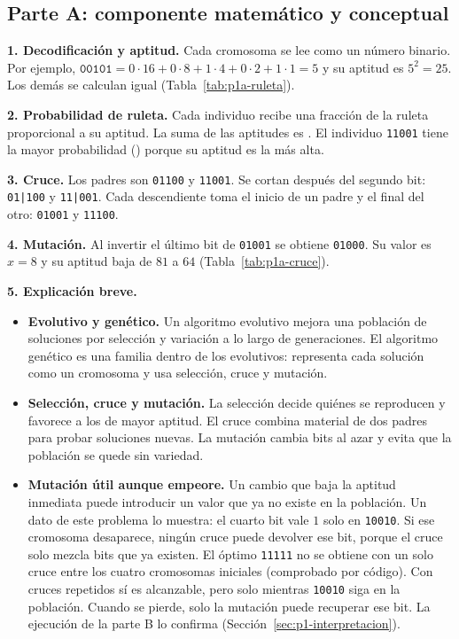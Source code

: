 \documentclass[12pt,a4paper]{article}
\begin{document}
\subsection{Parte A: componente matemático y conceptual}

\noindent\textbf{1. Decodificación y aptitud.} Cada cromosoma se lee como un
número binario. Por ejemplo,
$\texttt{00101}=0\cdot16+0\cdot8+1\cdot4+0\cdot2+1\cdot1=5$ y su aptitud es
$5^2=25$. Los demás se calculan igual (Tabla~\ref{tab:p1a-ruleta}).

\noindent\textbf{2. Probabilidad de ruleta.} Cada individuo recibe una
fracción de la ruleta proporcional a su aptitud. La suma de las aptitudes es
\PunoSuma{}. El individuo \texttt{11001} tiene la mayor probabilidad
(\PunoProbMax{}) porque su aptitud es la más alta.



\noindent\textbf{3. Cruce.} Los padres son \texttt{01100} y \texttt{11001}.
Se cortan después del segundo bit: \texttt{01|100} y \texttt{11|001}. Cada
descendiente toma el inicio de un padre y el final del otro:
\texttt{01001} y \texttt{11100}.

\noindent\textbf{4. Mutación.} Al invertir el último bit de \texttt{01001}
se obtiene \texttt{01000}. Su valor es $x=8$ y su aptitud baja de $81$ a
$64$ (Tabla~\ref{tab:p1a-cruce}).



\noindent\textbf{5. Explicación breve.}
\begin{itemize}
  \item \textbf{Evolutivo y genético.} Un algoritmo evolutivo mejora una
  población de soluciones por selección y variación a lo largo de
  generaciones. El algoritmo genético es una familia dentro de los
  evolutivos: representa cada solución como un cromosoma y usa selección,
  cruce y mutación.
  \item \textbf{Selección, cruce y mutación.} La selección decide quiénes se
  reproducen y favorece a los de mayor aptitud. El cruce combina material de
  dos padres para probar soluciones nuevas. La mutación cambia bits al azar
  y evita que la población se quede sin variedad.
  \item \textbf{Mutación útil aunque empeore.} Un cambio que baja la
  aptitud inmediata puede introducir un valor que ya no existe en la
  población. Un dato de este problema lo muestra: el cuarto bit vale $1$
  solo en \texttt{10010}. Si ese cromosoma desaparece, ningún cruce puede
  devolver ese bit, porque el cruce solo mezcla bits que ya existen. El
  óptimo \texttt{11111} no se obtiene con un solo cruce entre los cuatro
  cromosomas iniciales (comprobado por código). Con cruces repetidos sí es
  alcanzable, pero solo mientras \texttt{10010} siga en la población. Cuando
  se pierde, solo la mutación puede recuperar ese bit. La ejecución de la
  parte B lo confirma (Sección~\ref{sec:p1-interpretacion}).
\end{itemize}
\end{document}
